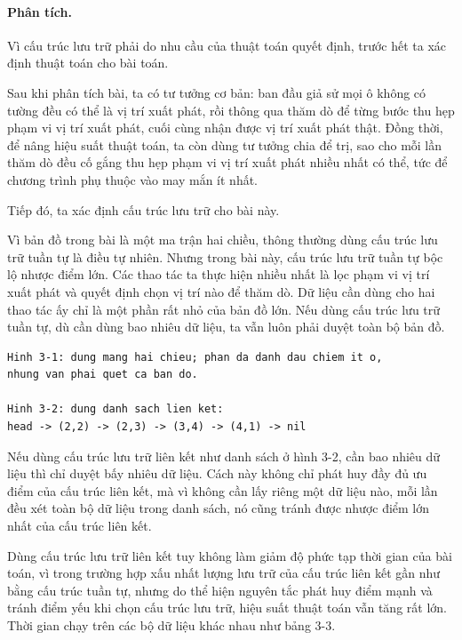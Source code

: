\documentclass[11pt]{article}
\begin{document}
\paragraph{Phân tích.}
Vì cấu trúc lưu trữ phải do nhu cầu của thuật toán quyết định, trước hết ta
xác định thuật toán cho bài toán.

Sau khi phân tích bài, ta có tư tưởng cơ bản: ban đầu giả sử mọi ô không có
tường đều có thể là vị trí xuất phát, rồi thông qua thăm dò để từng bước thu
hẹp phạm vi vị trí xuất phát, cuối cùng nhận được vị trí xuất phát thật. Đồng
thời, để nâng hiệu suất thuật toán, ta còn dùng tư tưởng chia để trị, sao cho
mỗi lần thăm dò đều cố gắng thu hẹp phạm vi vị trí xuất phát nhiều nhất có
thể, tức để chương trình phụ thuộc vào may mắn ít nhất.

Tiếp đó, ta xác định cấu trúc lưu trữ cho bài này.

Vì bản đồ trong bài là một ma trận hai chiều, thông thường dùng cấu trúc lưu
trữ tuần tự là điều tự nhiên. Nhưng trong bài này, cấu trúc lưu trữ tuần tự
bộc lộ nhược điểm lớn. Các thao tác ta thực hiện nhiều nhất là lọc phạm vi vị
trí xuất phát và quyết định chọn vị trí nào để thăm dò. Dữ liệu cần dùng cho
hai thao tác ấy chỉ là một phần rất nhỏ của bản đồ lớn. Nếu dùng cấu trúc lưu
trữ tuần tự, dù cần dùng bao nhiêu dữ liệu, ta vẫn luôn phải duyệt toàn bộ
bản đồ.

\begin{verbatim}
Hinh 3-1: dung mang hai chieu; phan da danh dau chiem it o,
nhung van phai quet ca ban do.

Hinh 3-2: dung danh sach lien ket:
head -> (2,2) -> (2,3) -> (3,4) -> (4,1) -> nil
\end{verbatim}

Nếu dùng cấu trúc lưu trữ liên kết như danh sách ở hình 3-2, cần bao nhiêu dữ
liệu thì chỉ duyệt bấy nhiêu dữ liệu. Cách này không chỉ phát huy đầy đủ ưu
điểm của cấu trúc liên kết, mà vì không cần lấy riêng một dữ liệu nào, mỗi
lần đều xét toàn bộ dữ liệu trong danh sách, nó cũng tránh được nhược điểm
lớn nhất của cấu trúc liên kết.

Dùng cấu trúc lưu trữ liên kết tuy không làm giảm độ phức tạp thời gian của
bài toán, vì trong trường hợp xấu nhất lượng lưu trữ của cấu trúc liên kết
gần như bằng cấu trúc tuần tự, nhưng do thể hiện nguyên tắc phát huy điểm
mạnh và tránh điểm yếu khi chọn cấu trúc lưu trữ, hiệu suất thuật toán vẫn
tăng rất lớn. Thời gian chạy trên các bộ dữ liệu khác nhau như bảng 3-3.
\end{document}
